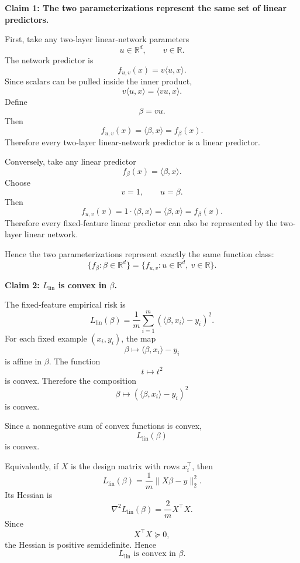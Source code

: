 \documentclass[11pt]{article}
\begin{document}
\begin{enumerate}
    \begin{solutionbox}

    \textbf{Claim 1: The two parameterizations represent the same set of linear predictors.}

    First, take any two-layer linear-network parameters
    \[
    u\in\mathbb{R}^d,
    \qquad
    v\in\mathbb{R}.
    \]
    The network predictor is
    \[
    f_{u,v}(x)=v\langle u,x\rangle.
    \]
    Since scalars can be pulled inside the inner product,
    \[
    v\langle u,x\rangle
    =
    \langle vu,x\rangle.
    \]
    Define
    \[
    \beta=vu.
    \]
    Then
    \[
    f_{u,v}(x)=\langle\beta,x\rangle=f_\beta(x).
    \]
    Therefore every two-layer linear-network predictor is a linear predictor.

    Conversely, take any linear predictor
    \[
    f_\beta(x)=\langle\beta,x\rangle.
    \]
    Choose
    \[
    v=1,
    \qquad
    u=\beta.
    \]
    Then
    \[
    f_{u,v}(x)=1\cdot\langle\beta,x\rangle=\langle\beta,x\rangle=f_\beta(x).
    \]
    Therefore every fixed-feature linear predictor can also be represented by the two-layer
    linear network.

    Hence the two parameterizations represent exactly the same function class:
    \[
    \boxed{
    \{f_\beta:\beta\in\mathbb{R}^d\}
    =
    \{f_{u,v}:u\in\mathbb{R}^d,\ v\in\mathbb{R}\}.
    }
    \]

    \medskip

    \textbf{Claim 2: $L_{\mathrm{lin}}$ is convex in $\beta$.}

    The fixed-feature empirical risk is
    \[
    L_{\mathrm{lin}}(\beta)
    =
    \frac1m\sum_{i=1}^m
    (\langle\beta,x_i\rangle-y_i)^2.
    \]
    For each fixed example $(x_i,y_i)$, the map
    \[
    \beta\mapsto \langle\beta,x_i\rangle-y_i
    \]
    is affine in $\beta$. The function
    \[
    t\mapsto t^2
    \]
    is convex. Therefore the composition
    \[
    \beta\mapsto(\langle\beta,x_i\rangle-y_i)^2
    \]
    is convex.

    Since a nonnegative sum of convex functions is convex,
    \[
    L_{\mathrm{lin}}(\beta)
    \]
    is convex.

    Equivalently, if $X$ is the design matrix with rows $x_i^\top$, then
    \[
    L_{\mathrm{lin}}(\beta)
    =
    \frac1m\|X\beta-y\|_2^2.
    \]
    Its Hessian is
    \[
    \nabla^2 L_{\mathrm{lin}}(\beta)
    =
    \frac2m X^\top X.
    \]
    Since
    \[
    X^\top X\succeq0,
    \]
    the Hessian is positive semidefinite. Hence
    \[
    \boxed{
    L_{\mathrm{lin}}\text{ is convex in }\beta.
    }
    \]


\end{solutionbox}
\end{enumerate}
\end{document}
